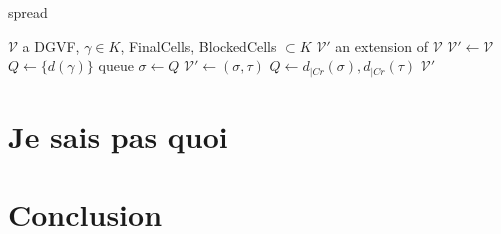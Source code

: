 \documentclass[10pt,a4paper]{report}
\begin{document}
\begin{algorithm}[h]
\caption{spread}
\begin{algorithmic}[1]
\REQUIRE $\mathcal{V}$ a DGVF, $\gamma \in K$, FinalCells, BlockedCells $\subset K$
\ENSURE $\mathcal{V'}$ an extension of $\mathcal{V}$
\STATE $\mathcal{V'} \gets \mathcal{V}$
\STATE $Q \gets \lbrace d(\gamma) \rbrace$ queue
	\STATE $\sigma \gets Q$
			\STATE $\mathcal{V'} \gets (\sigma, \tau)$
			\STATE $Q \gets d_{|Cr}(\sigma), d_{|Cr}(\tau)$
		\ENDIF
	\ENDIF
\ENDWHILE
\RETURN $\mathcal{V'}$
\end{algorithmic}
\end{algorithm}

\chapter{Je sais pas quoi}


\chapter{Conclusion}
\end{document}

